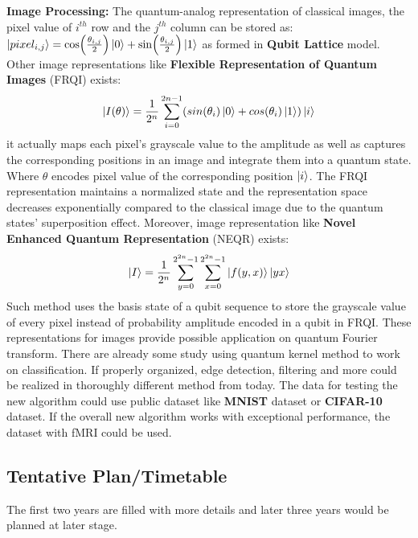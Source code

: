 \documentclass{article}
\begin{document}
\textbf{Image Processing:} The quantum-analog representation of classical images, the pixel value 
of $i^{th}$ row and the $j^{th}$ column can be stored as:
$\ket{pixel_{i,j}} = \cos(\frac{\theta_{i,j}}{2}) \ket{0} + 
\sin (\frac{\theta_{i,j}}{2}) \ket{1}$ as formed in \textbf{Qubit Lattice} model.
Other image representations like \textbf{Flexible Representation of 
Quantum Images} (FRQI) exists: 
\begin{equation}
  \ket{I(\theta)} = \frac{1}{2^n} \sum_{i=0}^{2n-1} (sin(\theta_i) \ket{0} + cos(\theta_i)\ket{1}) \ket{i}
\end{equation}
it actually maps each pixel's grayscale value to the amplitude as well as 
captures the corresponding positions in an image and integrate them into 
a quantum state. Where $\theta$ encodes pixel value of the corresponding 
position $\ket{i}$. The FRQI representation maintains a normalized state 
and the representation space decreases exponentially compared to the 
classical image due to the quantum states' superposition effect. 
Moreover, image representation like \textbf{Novel Enhanced Quantum Representation} (NEQR) exists:
\begin{equation}
  \ket{I} = \frac{1}{2^n} \sum^{2^{2n} -1 }_{y=0} \sum^{2^{2n} -1 }_{x=0} \ket{f(y,x)} \ket{y x}
\end{equation}
Such method uses the basis state of a qubit sequence to 
store the grayscale value of every pixel instead of 
probability amplitude encoded in a qubit in FRQI. 
These representations for images provide possible application on 
quantum Fourier transform. There are already some study using quantum kernel 
method to work on classification. If properly organized, edge detection, filtering 
and more could be realized in thoroughly different method from today. The 
data for testing the new algorithm could use public dataset like 
\textbf{MNIST} dataset or \textbf{CIFAR-10} dataset. If the 
overall new algorithm works with exceptional performance, the 
dataset with fMRI could be used. 

\subsection{Tentative Plan/Timetable}
The first two years are filled with more details 
and later three years would be planned at later stage. 
\end{document}
